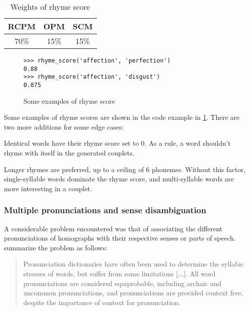 \documentclass[11pt,a4paper]{article}
\newenvironment{tight_enumerate}{
\begin{enumerate}
\setlength{\itemsep}{0pt}
\setlength{\parskip}{0pt}
}{\end{enumerate}}
\begin{document}
\begin{table}[ht]
\centering
\begin{tabular}{c c c}
	\hline\hline
	RCPM & OPM & SCM \\ [0.5ex]
	\hline
	70\% & 15\% & 15\% \\ [0.5ex]
	\hline
\end{tabular}
\caption{Weights of rhyme score}
\label{table:weight_rhyme_score}
\end{table}

\begin{figure}
\begin{Verbatim}[fontsize=\small]
>>> rhyme_score('affection', 'perfection')
0.88
>>> rhyme_score('affection', 'disgust')
0.075
\end{Verbatim}
\caption{Some examples of rhyme score}
\label{fig:rhymescorecode}
\end{figure}

Some examples of rhyme scores are shown in the code example in \ref{fig:rhymescorecode}. There are two more additions for some edge cases:

\begin{tight_enumerate}
	\vspace{-0.5em}
	\item
		Identical words have their rhyme score set to 0. As a rule, a word shouldn't rhyme with itself in the generated couplets.
	\item
		Longer rhymes are preferred, up to a ceiling of 6 phonemes. Without this factor, single-syllable words dominate the rhyme score, and multi-syllable words are more interesting in a couplet.
\end{tight_enumerate}

\subsubsection{Multiple pronunciations and sense disambiguation}

A considerable problem encountered was that of associating the different pronunciations of homographs with their respective senses or parts of speech. \citet{hopkins-kiela-2017} summarize the problem as follows:

\begin{quote}
Pronunciation dictionaries have often been used to determine the syllabic stresses of words, but suffer from some limitations [...]. All word pronunciations are considered equiprobable, including archaic and uncommon pronunciations, and pronunciations are provided context free, despite the importance of context for pronunciation.
\end{quote}
\end{document}
